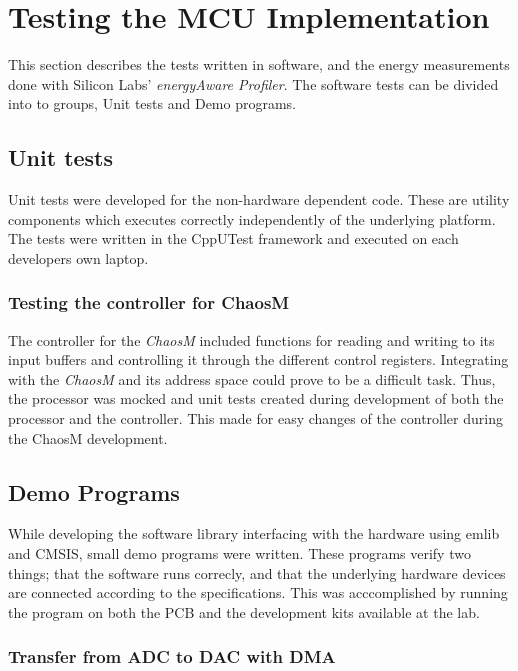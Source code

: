 \section{Testing the MCU Implementation}

This section describes the tests written in software, and the energy measurements
done with Silicon Labs' \textit{energyAware Profiler}. The software tests can be
divided into to groups, Unit tests and Demo programs.

\subsection{Unit tests}

Unit tests were developed for the non-hardware dependent code. These are
utility components which executes correctly independently of the underlying
platform. The tests were written in the CppUTest framework \cite{cpputest} and executed
on each developers own laptop.

\subsubsection{Testing the controller for ChaosM}
The controller for the \textit{ChaosM} included functions for reading and writing
to its input buffers and controlling it through the different control registers.
Integrating with the \textit{ChaosM} and its address space could prove to be a
difficult task. Thus, the processor was mocked and unit tests created during 
development of both the processor and the controller.
This made for easy changes of the controller during the ChaosM development.

\subsection{Demo Programs}

While developing the software library interfacing with the hardware using emlib
and CMSIS, small demo programs were written. These programs verify two things;
that the software runs correcly, and that the underlying hardware devices are
connected according to the specifications. This was acccomplished by running the
program on both the PCB and the development kits available at the lab.

\subsubsection{Transfer from ADC to DAC with DMA}
